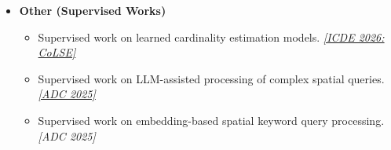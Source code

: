 \documentclass{resume}
\begin{document}
\begin{itemize}[parsep=0.4ex]
\begin{itemize}[parsep=0.3ex]
\item Built learned spatial index structures for multi-dimensional data, enabling efficient spatial query processing with improved lookup performance.
\href{https://people.eng.unimelb.edu.au/baileyj/papers/ICDE2023_ELSI.pdf}{\textit{[ICDE 2023\faExternalLink]}}

\item Developed recursive learned spatial index structures and studied their effectiveness for spatial query workloads.
\href{https://github.com/Liuguanli/RSMI}{\faGithub}
\href{https://www.vldb.org/pvldb/vol13/p2341-qi.pdf}{\textit{[VLDB 2020\faExternalLink]}}
\end{itemize}

\item \textbf{Other (Supervised Works)}
\begin{itemize}[parsep=0.3ex]
    \item Supervised work on learned cardinality estimation models. 
    \href{<paper-link>}{\textit{[ICDE 2026: CoLSE\faExternalLink]}}

   

    \item Supervised work on LLM-assisted processing of complex spatial queries. 
    \href{https://github.com/AI-DB-UoM/complex_spatial_data_generation}{\faGithub}
    \href{https://findanexpert.unimelb.edu.au/scholarlywork/2270718-llm-enhanced-processing-of-complex-spatial-queries?cache=1772143387383}{\textit{[ADC 2025\faExternalLink]}}

     \item Supervised work on embedding-based spatial keyword query processing.{\textit{[ADC 2025]}}
\end{itemize}

\end{itemize}


\end{document}
